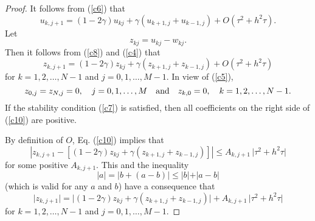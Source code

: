 \begin{proof}
It follows from (\ref{c6}) that
\begin{equation}
u_{k,j+1}=(1-2\gamma)u_{kj}+\gamma
\left(u_{k+1,j}+u_{k-1,j}\right)+O(\tau^2+h^{2}\tau).  \label{c8}
\end{equation}
Let
\begin{equation}
z_{kj}=u_{kj}-w_{kj}. \label{c9}
\end{equation}
Then it follows from (\ref{c8}) and (\ref{c4}) that
\begin{equation}
z_{k,j+1}=(1-2\gamma)z_{kj}+\gamma
\left(z_{k+1,j}+z_{k-1,j}\right)+O(\tau^2+h^{2}\tau)  \label{c10}
\end{equation}
for $k=1,2,\dots,N-1$ and $j=0,1,\dots,M-1$.
In view of (\ref{c5}),
\begin{equation}
z_{0,j}=z_{N,j}=0,  \quad j=0,1,\dots,M \quad {\rm and} \quad
z_{k,0}=0, \quad k=1,2,\dots,N-1. \label{c11}
\end{equation}
If the stability condition (\ref{c7}) is satisfied, then
all coefficients on the right side of (\ref{c10}) are positive.

By definition of $O$, Eq. (\ref{c10}) implies that
\[
\left\vert z_{k,j+1}-\left[(1-2\gamma)z_{kj}+\gamma
\left(z_{k+1,j}+z_{k-1,j}\right)\right]\right\vert \leq A_{k,j+1} \, \vert\tau^2+h^{2}\tau\vert
\]
for some positive $A_{k,j+1}$. This and the inequality
\[
\vert a\vert = \vert b +(a-b)\vert\leq \vert b\vert + \vert a-b\vert
\]
(which is valid for any $a$ and $b$)
have a consequence that
\begin{equation}
\vert z_{k,j+1}\vert =\vert (1-2\gamma)z_{kj}+\gamma
\left(z_{k+1,j}+z_{k-1,j}\right)\vert +A_{k,j+1} \, \vert\tau^2+h^{2}\tau\vert  \label{c10a}
\end{equation}
for  $k=1,2,\dots,N-1$ and $j=0,1,\dots,M-1$.


\end{proof}
